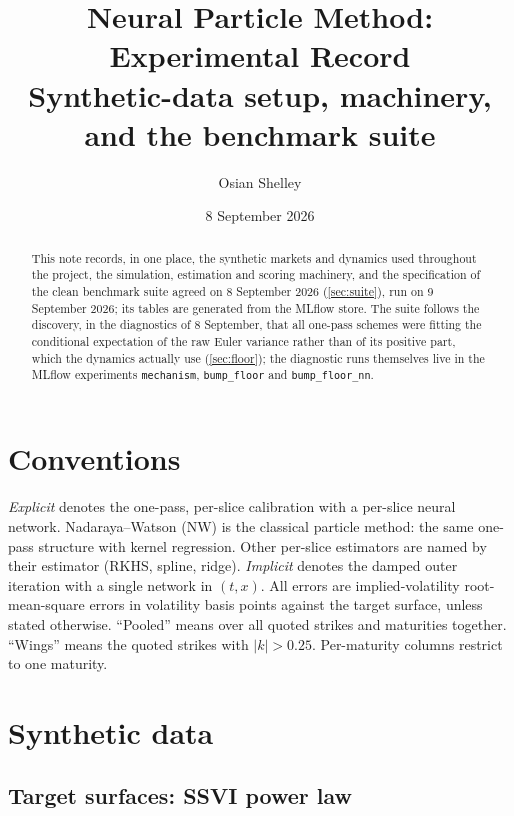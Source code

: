 \documentclass[11pt,a4paper]{article}
\title{Neural Particle Method: Experimental Record\\ \large Synthetic-data setup, machinery, and the benchmark suite}
\author{Osian Shelley}
\date{8 September 2026}
\newcommand{\code}[1]{\texttt{#1}}
\begin{document}
\maketitle

\begin{abstract}
This note records, in one place, the synthetic markets and dynamics used throughout the project, the simulation, estimation and scoring machinery, and the specification of the clean benchmark suite agreed on 8 September 2026 (\cref{sec:suite}), run on 9 September 2026; its tables are generated from the MLflow store. The suite follows the discovery, in the diagnostics of 8 September, that all one-pass schemes were fitting the conditional expectation of the raw Euler variance rather than of its positive part, which the dynamics actually use (\cref{sec:floor}); the diagnostic runs themselves live in the MLflow experiments \code{mechanism}, \code{bump\_floor} and \code{bump\_floor\_nn}.
\end{abstract}

\tableofcontents

\section{Conventions}\label{sec:conv}

\emph{Explicit} denotes the one-pass, per-slice calibration with a per-slice neural network. Nadaraya--Watson (NW) is the classical particle method: the same one-pass structure with kernel regression. Other per-slice estimators are named by their estimator (RKHS, spline, ridge). \emph{Implicit} denotes the damped outer iteration with a single network in $(t,x)$. All errors are implied-volatility root-mean-square errors in volatility basis points against the target surface, unless stated otherwise. ``Pooled'' means over all quoted strikes and maturities together. ``Wings'' means the quoted strikes with $|k|>0.25$. Per-maturity columns restrict to one maturity.

\section{Synthetic data}\label{sec:data}

\subsection{Target surfaces: SSVI power law}\label{sec:ssvi}
\end{document}
